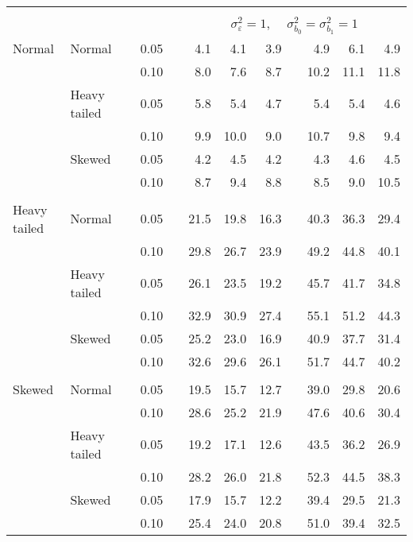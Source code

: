 \begin{table}[ht]
\begin{scriptsize}
\begin{tabular}{ll p{.1cm} c p{.1cm} rrr p{.1cm} rrr}
&&&&&&&&&&&\\
& && && \multicolumn{7}{c}{$\sigma_{\varepsilon}^2 = 1$, \ \ $\sigma_{b_0}^2 = \sigma_{b_1}^2 = 1$} \\ \cline{6-12}
 \rowcolor{gray!20} Normal & Normal &  & 0.05 &  & 4.1 & 4.1 & 3.9 &  & 4.9 & 6.1 & 4.9 \\ 
\rowcolor{gray!20}    &  &  & 0.10 &  & 8.0 & 7.6 & 8.7 &  & 10.2 & 11.1 & 11.8 \\ 
\rowcolor{gray!20}    & Heavy tailed &  & 0.05 &  & 5.8 & 5.4 & 4.7 &  & 5.4 & 5.4 & 4.6 \\ 
\rowcolor{gray!20}    &  &  & 0.10 &  & 9.9 & 10.0 & 9.0 &  & 10.7 & 9.8 & 9.4 \\ 
\rowcolor{gray!20}    & Skewed &  & 0.05 &  & 4.2 & 4.5 & 4.2 &  & 4.3 & 4.6 & 4.5 \\ 
\rowcolor{gray!20}    &  &  & 0.10 &  & 8.7 & 9.4 & 8.8 &  & 8.5 & 9.0 & 10.5 \\ 
&&&&&&&&&&&\\
  Heavy tailed & Normal &  & 0.05 &  & 21.5 & 19.8 & 16.3 &  & 40.3 & 36.3 & 29.4 \\ 
   &  &  & 0.10 &  & 29.8 & 26.7 & 23.9 &  & 49.2 & 44.8 & 40.1 \\ 
   & Heavy tailed &  & 0.05 &  & 26.1 & 23.5 & 19.2 &  & 45.7 & 41.7 & 34.8 \\ 
   &  &  & 0.10 &  & 32.9 & 30.9 & 27.4 &  & 55.1 & 51.2 & 44.3 \\ 
   & Skewed &  & 0.05 &  & 25.2 & 23.0 & 16.9 &  & 40.9 & 37.7 & 31.4 \\ 
   &  &  & 0.10 &  & 32.6 & 29.6 & 26.1 &  & 51.7 & 44.7 & 40.2 \\ 
&&&&&&&&&&&\\
  Skewed & Normal &  & 0.05 &  & 19.5 & 15.7 & 12.7 &  & 39.0 & 29.8 & 20.6 \\ 
   &  &  & 0.10 &  & 28.6 & 25.2 & 21.9 &  & 47.6 & 40.6 & 30.4 \\ 
   & Heavy tailed &  & 0.05 &  & 19.2 & 17.1 & 12.6 &  & 43.5 & 36.2 & 26.9 \\ 
   &  &  & 0.10 &  & 28.2 & 26.0 & 21.8 &  & 52.3 & 44.5 & 38.3 \\ 
   & Skewed &  & 0.05 &  & 17.9 & 15.7 & 12.2 &  & 39.4 & 29.5 & 21.3 \\ 
   &  &  & 0.10 &  & 25.4 & 24.0 & 20.8 &  & 51.0 & 39.4 & 32.5 \\ 


\end{tabular}
\end{scriptsize}
\end{table}

